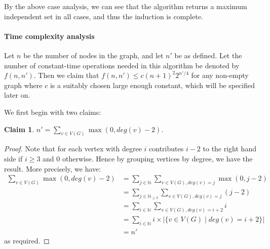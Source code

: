 \documentclass[answers]{exam}
\newtheorem{claim}{Claim}
\begin{document}
\begin{questions}
\begin{solution}
By the above case analysis, we can see that the algorithm returns a maximum independent set in all cases, and thus the induction is complete.

\paragraph{Time complexity analysis} Let $n$ be the number of nodes in the graph, and let $n'$ be as defined. Let the number of constant-time operations
needed in this algorithm be denoted by $f(n, n')$. Then we claim that $f(n, n') \le c (n + 1)^2 2^{n'/4}$ for any non-empty graph where $c$ is a suitably chosen large enough constant, which will be specified later on.

We first begin with two claims:

\begin{claim}
    $n' = \sum_{v \in V(G)} \max(0, deg(v) - 2)$.
\end{claim}
\begin{proof}
    Note that for each vertex with degree $i$ contributes $i - 2$ to the right hand side if $i \ge 3$ and $0$ otherwise. Hence by grouping vertices by degree, we have the result. More precisely, we
    have:
    \begin{align*}
        \sum_{v \in V(G)} \max(0, deg(v) - 2)
           &= \sum_{j \in \mathbb{N}}\sum_{v \in V(G), deg(v) = j} \max(0, j - 2)\\
           &= \sum_{j \in \mathbb{N}_{\ge 3}}\sum_{v \in V(G), deg(v) = j} (j - 2)\\
           &= \sum_{i \in \mathbb{N}} \sum_{v \in V(G), deg(v) = i + 2} i\\
           &= \sum_{i \in \mathbb{N}} i \times |\{v \in V(G) \mid deg(v) = i + 2\}|\\
           &= n'
    \end{align*}
    as required.
\end{proof}


\end{solution}
\end{questions}
\end{document}

